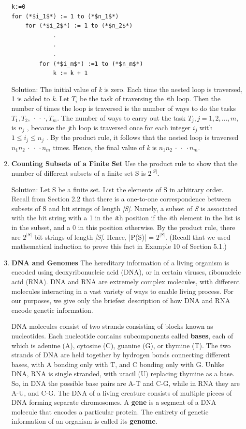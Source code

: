 \documentclass[11pt,a4paper]{book}
\begin{document}
\begin{enumerate}[label=Example~\arabic*]
\begin{lstlisting}[style=CStyle]
k:=0
for (*$i_1$*) := 1 to (*$n_1$*)
	for (*$i_2$*) := 1 to (*$n_2$*)
			.
			.
			.
		for (*$i_m$*) :=1 to (*$n_m$*)
			k := k + 1
\end{lstlisting}

Solution: The initial value of \textit{k} is zero.
Each time the nested loop is traversed, 1 is added to \textit{k}.
Let $T_i$ be the task of traversing the \textit{i}th loop.
Then the number of times the loop is traversed is the number of ways to do the tasks $T_1, T_2, ~\cdot~\cdot~\cdot , T_m$.
The number of ways to carry out the task $T_j , j = 1, 2, . . . , m$, is $n_j$ , because the \textit{j}th loop is traversed once for each integer $i_j$ with $1 \leq i_j \leq n_j$ . By the product rule, it follows that the nested loop is traversed $n_1n_2 ~\cdot~\cdot~\cdot n_m$ times.
Hence, the final value of \textit{k} is $n_1n_2 ~\cdot~\cdot~\cdot n_m$.

\item \textbf{Counting Subsets of a Finite Set} Use the product rule to show that the number of different subsets of a finite set S is $2^{|S|}$.

Solution: Let S be a finite set.
List the elements of S in arbitrary order.
Recall from Section 2.2 that there is a one-to-one correspondence between subsets of S and bit strings of length \emph{|S|}.
Namely, a subset of \emph{S} is associated with the bit string with a 1 in the \textit{i}th position if the \textit{i}th element in the list is in the subset, and a 0 in this position otherwise.
By the product rule, there are $2^{|S|}$ bit strings of length \emph{|S|}.
Hence, |P(S)| = $2^{|S|}$.
(Recall that we used mathematical induction to prove this fact in Example 10 of Section 5.1.)

\item \textbf{DNA and Genomes} The hereditary information of a living organism is encoded using deoxyribonucleic acid (DNA), or in certain viruses, ribonucleic acid (RNA).
DNA and RNA are extremely complex molecules, with different molecules interacting in a vast variety of ways to enable living process.
For our purposes, we give only the briefest description of how DNA and RNA encode genetic information.

DNA molecules consist of two strands consisting of blocks known as nucleotides.
Each nucleotide contains subcomponents called \textbf{bases}, each of which is adenine (A), cytosine (C), guanine (G), or thymine (T).
The two strands of DNA are held together by hydrogen bonds connecting different bases, with A bonding only with T, and C bonding only with G.
Unlike DNA, RNA is single stranded, with uracil (U) replacing thymine as a base.
So, in DNA the possible base pairs are A-T and C-G, while in RNA they are A-U, and C-G.
The DNA of a living creature consists of multiple pieces of DNA forming separate chromosomes.
A \textbf{gene} is a segment of a DNA molecule that encodes a particular protein.
The entirety of genetic information of an organism is called its \textbf{genome}.


\end{enumerate}
\end{document}
